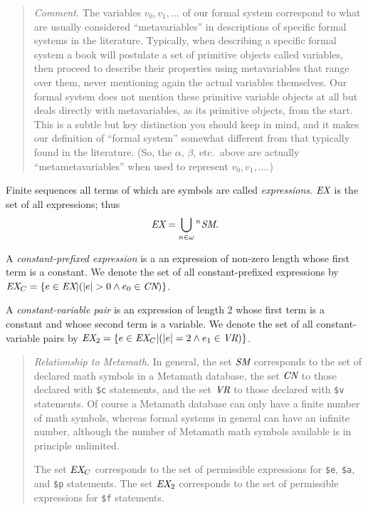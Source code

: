 {\footnotesize\begin{quotation}
{\em Comment.} The variables $v_0, v_1, \ldots$ of our formal system
correspond to what are usually considered ``metavariables'' in
descriptions of specific formal systems in the literature.  Typically,
when describing a specific formal system a book will postulate a set of
primitive objects called variables, then proceed to describe their
properties using metavariables that range over them, never mentioning
again the actual variables themselves.  Our formal system does not
mention these primitive variable objects at all but deals directly with
metavariables, as its primitive objects, from the start.  This is a
subtle but key distinction you should keep in mind, and it makes our
definition of ``formal system'' somewhat different from that typically
found in the literature.  (So, the $\alpha$, $\beta$, etc.\ above are
actually ``metametavariables'' when used to represent $v_0, v_1,
\ldots$.)
\end{quotation}}

Finite sequences all terms of which are symbols are called {\em
expressions}.  $\mbox{\em EX}$ is
the set of all expressions; thus
\begin{displaymath}
\mbox{\em EX} = \bigcup _{n \in \omega} {}^n \mbox{\em SM}.
\end{displaymath}

A {\em constant-prefixed expression}
is a an expression of non-zero length
whose first term is a constant.  We denote the set of all constant-prefixed
expressions by $\mbox{\em EX}_C = \{ e \in \mbox{\em EX} | ( |e| > 0 \wedge
e_0 \in \mbox{\em CN} ) \}$.

A {\em constant-variable pair}
is an expression of length 2 whose first term
is a constant and whose second term is a variable.  We denote the set of all
constant-variable pairs by $\mbox{\em EX}_2 = \{ e \in \mbox{\em EX}_C | ( |e|
= 2 \wedge e_1 \in \mbox{\em VR} ) \}$.


{\footnotesize\begin{quotation}
{\em Relationship to Metamath.} In general, the set $\mbox{\em SM}$
corresponds to the set of declared math symbols in a Metamath database, the
set $\mbox{\em CN}$ to those declared with \texttt{\$c} statements, and the set
$\mbox{\em VR}$ to those declared with \texttt{\$v} statements.  Of course a
Metamath database can only have a finite number of math symbols, whereas
formal systems in general can have an infinite number, although the number of
Metamath math symbols available is in principle unlimited.

The set $\mbox{\em EX}_C$ corresponds to the set of permissible expressions
for \texttt{\$e}, \texttt{\$a}, and \texttt{\$p} statements.  The set $\mbox{\em EX}_2$
corresponds to the set of permissible expressions for \texttt{\$f} statements.
\end{quotation}}

